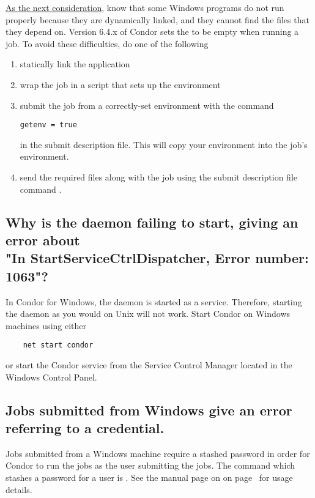 \underline{As the next consideration},
know that 
some Windows programs do not run properly because they are dynamically linked,
and they cannot find the  files that they depend on.
Version 6.4.x of Condor sets the  to be empty when
running a job.
To avoid these difficulties, do one of the following
\begin{enumerate}
\item statically link the application
\item wrap the job in a script that sets up the environment
\item submit the job from a correctly-set environment with the command
\begin{verbatim}
getenv = true
\end{verbatim}
in the submit description file.
This will copy your environment into the job's environment.
\item send the required  files along with the job
using the submit description file command .
\end{enumerate}


\subsection*{Why is the  daemon failing to start, giving an error about\\
   	"In StartServiceCtrlDispatcher, Error number: 1063"?}
In Condor for Windows, the  daemon is started as a service.
Therefore,
starting the  daemon as you would on Unix will not work.
Start Condor on Windows machines using either
\begin{verbatim}
	net start condor
\end{verbatim}
or start the Condor service from the Service Control Manager located in
the Windows Control Panel.

\subsection*{Jobs submitted from Windows give an error referring to a credential.}

Jobs submitted from a Windows machine require a stashed password in order
for Condor to run the jobs as the user submitting the jobs.
The command which stashes a password for a user is .
See the manual page on
on page~\pageref{man-condor-store-cred}
for usage details.

